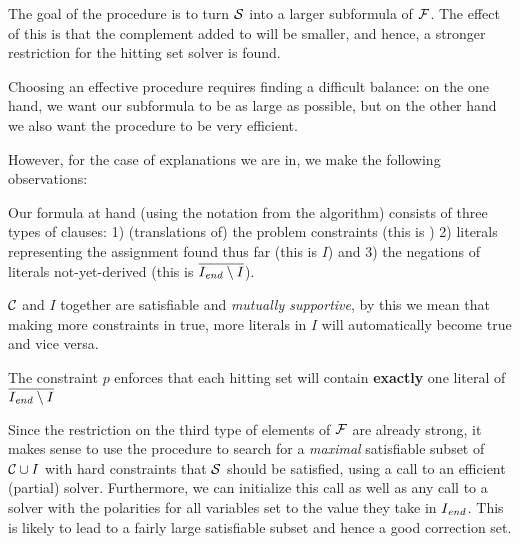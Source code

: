 The goal of the \grow procedure is to turn $\mathcal{S}$ into a larger subformula of $\mathcal{F} $. The effect of this is that the complement added to \setstohit will be smaller, and hence, a stronger restriction for the hitting set solver is found.  

Choosing an effective \grow procedure requires finding a difficult balance: on the one hand, we want our subformula to be as large as possible, %
but on the other hand we also want the procedure to be very efficient. 


However, for the case of explanations we are in, we make the following observations: 
\begin{compactitem}
 \item Our formula at hand (using the notation from the \onestepo algorithm) consists of three types of clauses: 1) (translations of) the problem constraints (this is \formulac) 2) literals representing the assignment found thus far (this is $I$) and 3) the negations of literals not-yet-derived (this is $\overline{I_\mathit{end} \setminus I}$). 
 \item $\mathcal{C} $ and $I$ together are satisfiable and \emph{mutually supportive}, by this we mean that making more constraints in \formulac true, more literals in $I$ will automatically become true and vice versa. 
 \item The constraint $p$ enforces that each hitting set will contain \textbf{exactly} one literal of  $\overline{I_\mathit{end} \setminus I}$
\end{compactitem}
Since the restriction on the third type of elements of $\mathcal{F} $ are already strong, it makes sense to use the \grow procedure to search for a \emph{maximal} satisfiable subset of $\mathcal{C} \cup I$ with hard constraints that $\mathcal{S}$ should be satisfied, using a call to an efficient  (partial) \maxsat solver. Furthermore, we can initialize this call as well as any call to a \sat solver with the polarities for all variables set to the value they take in $I_\mathit{end} $. This is likely to lead to a fairly large satisfiable subset and hence a good correction set. 






